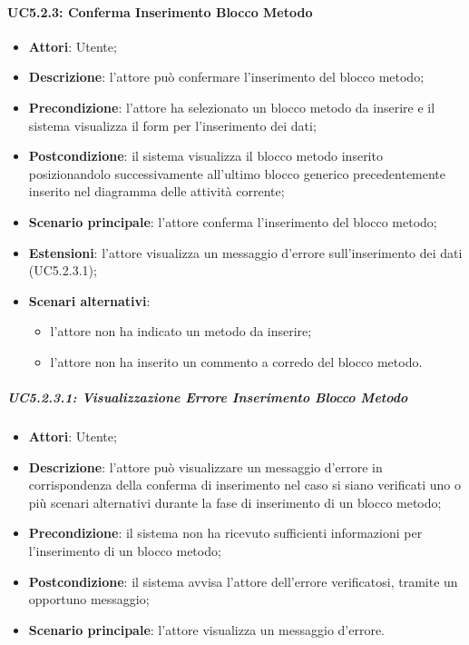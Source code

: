 \paragraph{UC5.2.3: Conferma Inserimento Blocco Metodo}
\label{UC5.2.3}
\begin{itemize}
	\item \textbf{Attori}: Utente;
	\item \textbf{Descrizione}: l'attore può confermare l'inserimento del blocco metodo;
	\item \textbf{Precondizione}: l'attore ha selezionato un blocco metodo da inserire e il sistema visualizza il form per l'inserimento dei dati;
	\item \textbf{Postcondizione}: il sistema visualizza il blocco metodo inserito posizionandolo successivamente all'ultimo blocco generico precedentemente inserito nel diagramma delle attività corrente;	
	\item \textbf{Scenario principale}: l'attore conferma l'inserimento del blocco metodo;
	\item \textbf{Estensioni}: l'attore visualizza un messaggio d'errore sull'inserimento dei dati (UC5.2.3.1);
	\item \textbf{Scenari alternativi}:
	\begin{itemize}
		\item l'attore non ha indicato un metodo da inserire;
		\item l'attore non ha inserito un commento a corredo del blocco metodo.
	\end{itemize}
\end{itemize}

\subparagraph{UC5.2.3.1: Visualizzazione Errore Inserimento Blocco Metodo}
\label{UC5.2.3.1}
\begin{itemize}
	\item \textbf{Attori}: Utente;
	\item \textbf{Descrizione}: l'attore può visualizzare un messaggio d'errore in corrispondenza della conferma di inserimento nel caso si siano verificati uno o più scenari alternativi durante la fase di inserimento di un blocco metodo;
	\item \textbf{Precondizione}: il sistema non ha ricevuto sufficienti informazioni per l'inserimento di un blocco metodo;
	\item \textbf{Postcondizione}: il sistema avvisa l'attore dell'errore verificatosi, tramite un opportuno messaggio;
	\item \textbf{Scenario principale}: l'attore visualizza un messaggio d'errore.
\end{itemize}

